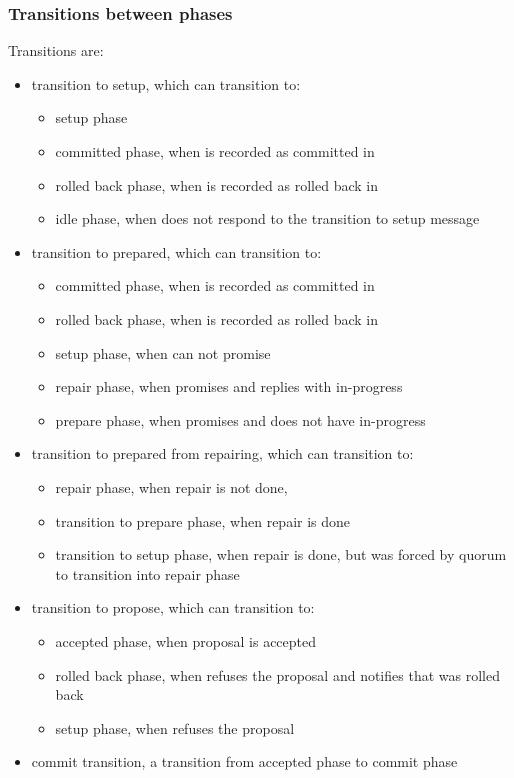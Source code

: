 \subsubsection{Transitions between phases}
Transitions are:
\begin{itemize}
\item transition to setup, which can transition to:
	\begin{itemize}
		\item setup phase
		\item committed phase, when \txState is recorded as committed in \txLog  
		\item rolled back phase, when \txState is recorded as rolled back in \txLog
		\item idle phase, when  does not respond to the transition to setup message
	\end{itemize}
\item transition to prepared, which can transition to:
	\begin{itemize}
		\item committed phase, when \txState is recorded as committed in \txLog  
		\item rolled back phase, when \txState is recorded as rolled back in \txLog\item setup phase, when  can not promise
		\item repair phase, when  promises and replies with in-progress \txState
		\item prepare phase, when  promises and does not have in-progress \txState 
	\end{itemize}
\item transition to prepared from repairing, which can transition to:
	\begin{itemize}
		\item repair phase, when repair is not done,
		\item transition to prepare phase, when repair is done
		\item transition to setup phase, when repair is done, but  was forced by quorum to transition into repair phase
	\end{itemize}
\item transition to propose, which can transition to:
	\begin{itemize}
		\item accepted phase, when proposal is accepted
		\item rolled back phase, when  refuses the proposal and notifies that \txState was rolled back
		\item setup phase, when  refuses the proposal
	\end{itemize}
\item commit transition, a transition from accepted phase to commit phase
\end{itemize}

